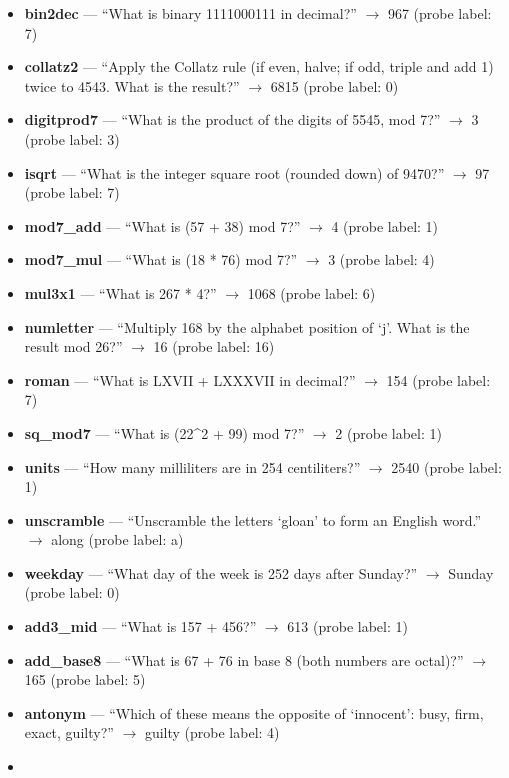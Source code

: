 \begin{itemize}
\tightlist
\item
  \textbf{bin2dec} --- ``What is binary 1111000111 in decimal?'' $\rightarrow$ 967 (probe label: 7)
\item
  \textbf{collatz2} --- ``Apply the Collatz rule (if even, halve; if odd, triple and add 1) twice to 4543. What is the result?'' $\rightarrow$ 6815 (probe label: 0)
\item
  \textbf{digitprod7} --- ``What is the product of the digits of 5545, mod 7?'' $\rightarrow$ 3 (probe label: 3)
\item
  \textbf{isqrt} --- ``What is the integer square root (rounded down) of 9470?'' $\rightarrow$ 97 (probe label: 7)
\item
  \textbf{mod7\_add} --- ``What is (57 + 38) mod 7?'' $\rightarrow$ 4 (probe label: 1)
\item
  \textbf{mod7\_mul} --- ``What is (18 * 76) mod 7?'' $\rightarrow$ 3 (probe label: 4)
\item
  \textbf{mul3x1} --- ``What is 267 * 4?'' $\rightarrow$ 1068 (probe label: 6)
\item
  \textbf{numletter} --- ``Multiply 168 by the alphabet position of `j'. What is the result mod 26?'' $\rightarrow$ 16 (probe label: 16)
\item
  \textbf{roman} --- ``What is LXVII + LXXXVII in decimal?'' $\rightarrow$ 154 (probe label: 7)
\item
  \textbf{sq\_mod7} --- ``What is (22\^{}2 + 99) mod 7?'' $\rightarrow$ 2 (probe label: 1)
\item
  \textbf{units} --- ``How many milliliters are in 254 centiliters?'' $\rightarrow$ 2540 (probe label: 1)
\item
  \textbf{unscramble} --- ``Unscramble the letters `gloan' to form an English word.'' $\rightarrow$ along (probe label: a)
\item
  \textbf{weekday} --- ``What day of the week is 252 days after Sunday?'' $\rightarrow$ Sunday (probe label: 0)
\item
  \textbf{add3\_mid} --- ``What is 157 + 456?'' $\rightarrow$ 613 (probe label: 1)
\item
  \textbf{add\_base8} --- ``What is 67 + 76 in base 8 (both numbers are octal)?'' $\rightarrow$ 165 (probe label: 5)
\item
  \textbf{antonym} --- ``Which of these means the opposite of `innocent': busy, firm, exact, guilty?'' $\rightarrow$ guilty (probe label: 4)
\item

\end{itemize}
